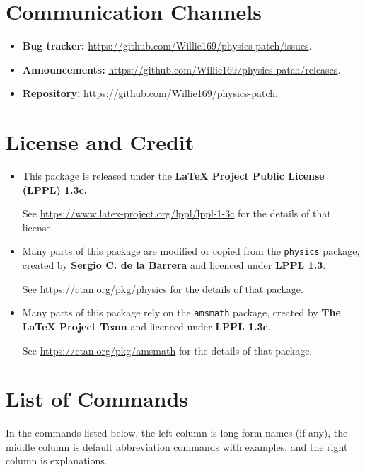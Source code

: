 \documentclass[a4paper,12pt]{article}
\begin{document}
\section{Communication Channels}
\begin{itemize}
\item \textbf{Bug tracker:} \href{https://github.com/Willie169/physics-patch/issues}{https://github.com/Willie169/physics-patch/issues}.
\item \textbf{Announcements:} \href{https://github.com/Willie169/physics-patch/releases}{https://github.com/Willie169/physics-patch/releases}.
\item \textbf{Repository:} \href{https://github.com/Willie169/physics-patch}{https://github.com/Willie169/physics-patch}.
\end{itemize}
\section{License and Credit}
\begin{itemize}
\item
This package is released under the \textbf{LaTeX Project Public License (LPPL) 1.3c.}

See \href{https://www.latex-project.org/lppl/lppl-1-3c}{https://www.latex-project.org/lppl/lppl-1-3c} for the details of that license.
\item Many parts of this package are modified or copied from the \texttt{physics} package, created by \textbf{Sergio C. de la Barrera} and licenced under \textbf{LPPL 1.3}.

See \href{https://ctan.org/pkg/physics}{https://ctan.org/pkg/physics} for the details of that package.
\item Many parts of this package rely on the \texttt{amsmath} package, created by \textbf{The \LaTeX{} Project Team} and licenced under \textbf{LPPL 1.3c}.

See \href{https://ctan.org/pkg/amsmath}{https://ctan.org/pkg/amsmath} for the details of that package.
\end{itemize}
\section{List of Commands}
In the commands listed below, the left column is long-form names (if any), the middle column is default abbreviation commands with examples, and the right column is explanations.
\end{document}
